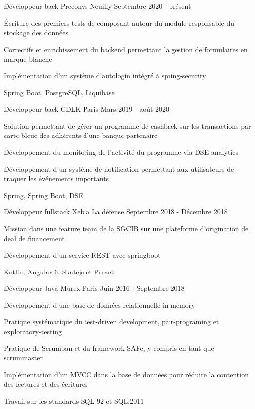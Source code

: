 
\begin{cventries}
	
\cventry
{Développeur back}
{Preconys}
{Neuilly}
{Septembre 2020 - présent}
{
	\begin{cvitems}
	\item{Écriture des premiers tests de composant autour du module responsable du stockage des données}
	\item{Correctifs et enrichissement du backend permettant la gestion de formulaires en marque blanche}
	\item{Implémentation d'un système d'autologin intégré à spring-security}
	\item{Spring Boot, PostgreSQL, Liquibase}
	\end{cvitems}
}

\cventry
{Développeur back}
{CDLK}
{Paris}
{Mars 2019 - août 2020}
{
	\begin{cvitems}
	\item{Solution permettant de gérer un programme de cashback sur les transactions par carte bleue des adhérents d'une banque partenaire}
	\item{Développement du monitoring de l'activité du programme via DSE analytics}
	\item{Développement d'un système de notification permettant aux utilisateurs de traquer les événements importants}
	\item{Spring, Spring Boot, DSE}
	\end{cvitems}
}

\cventry
{Développeur fullstack}
{Xebia}
{La défense}
{Septembre 2018 - Décembre 2018}
{
	\begin{cvitems}
	\item{Mission dans une feature team de la SGCIB sur une plateforme d'origination de deal de financement}
	\item{Développement d'un service REST avec springboot}
	\item{Kotlin, Angular 6, Skatejs et Preact}
	\end{cvitems}
}

\cventry
{Développeur Java}
{Murex}
{Paris}
{Juin 2016 - Septembre 2018}
{
	\begin{cvitems}
	\item{Développement d'une base de données relationnelle in-memory}
	\item{Pratique systématique du test-driven development, pair-programing et exploratory-testing}
	\item{Pratique de Scrumban et du framework SAFe, y compris en tant que scrummaster}
	\item{Implémentation d'un MVCC dans la base de données pour réduire la contention des lectures et des écritures}
	\item{Travail sur les standards SQL-92 et SQL:2011}
	\end{cvitems}
}


\end{cventries}
